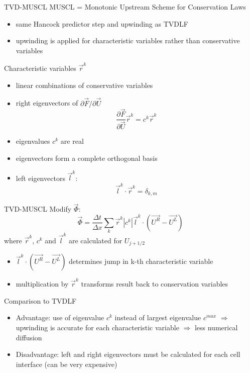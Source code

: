 \begin{frame}{TVD-MUSCL}
MUSCL = Monotonic Upstream Scheme for Conservation Laws 
\begin{itemize}
	\item same Hancock predictor step and upwinding as TVDLF
	\item upwinding is applied for characteristic variables rather than conservative variables
\end{itemize}
Characteristic variables $\vec{r}^k$
\begin{itemize}
	\item linear combinations of conservative variables
	\item right eigenvectors of $\partial \vec{F} / \partial \vec{U}$
	\begin{equation*}
	\frac{\partial \vec{F}}{\partial \vec{U}} \vec{r}^k = c^k \vec{r}^k
	\end{equation*}
	\item eigenvalues $c^k$ are real
	\item eigenvectors form a complete orthogonal basis
	\item left eigenvectors $\vec{l}^k$:
	\begin{equation*}
	\vec{l}^k \cdot \vec{r}^k = \delta_{k,m}
	\end{equation*}
\end{itemize}
\end{frame}

\begin{frame}{TVD-MUSCL}
	Modify $\vec{\Phi}$:
	\begin{equation*}
	\vec{\Phi} = \frac{\Delta t}{\Delta x} \sum_{k} \vec{r}^k | c^k | \vec{l}^k \cdot (\vec{U^R} - \vec{U^L})
	\end{equation*}
	where $\vec{r}^k$, $c^k$ and $\vec{l}^k$ are calculated for $U_{j+1/2}$
	\begin{itemize}
		\item $\vec{l}^k \cdot (\vec{U^R} - \vec{U^L})$ determines jump in k-th characteristic variable
		\item multiplication by $\vec{r}^k$ transforms result back to conservation variables
	\end{itemize}
	Comparison to TVDLF
	\begin{itemize}
		\item Advantage: use of eigenvalue $c^k$ instead of largest eigenvalue $c^{max}$ $\Rightarrow$ upwinding is accurate for each characteristic variable $\Rightarrow$ less numerical diffusion
		\item Disadvantage: left and right eigenvectors must be calculated for each cell interface (can be very expensive)
	\end{itemize}
\end{frame}



